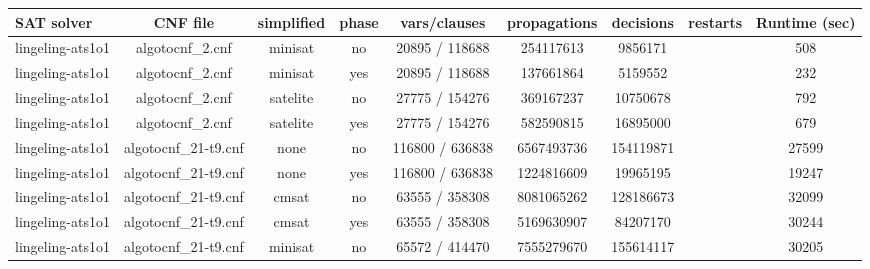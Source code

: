 \begin{appendices}
\begin{table}[p]
  \begin{center}
    \begin{tabular}{l|cccccccc}
        \textbf{SAT solver} & \textbf{CNF file} & \textbf{simplified} & \textbf{phase} & \textbf{vars/clauses} & \textbf{propagations} & \textbf{decisions} & \textbf{restarts} & \textbf{Runtime (sec)} \\
      \hline
  lingeling-ats1o1               & algotocnf\_2.cnf               & minisat    & no    & 20895 / 118688 & 254117613 & 9856171   &            & 508 \\ %
  lingeling-ats1o1               & algotocnf\_2.cnf               & minisat    & yes   & 20895 / 118688 & 137661864 & 5159552   &            & 232 \\ %
  lingeling-ats1o1               & algotocnf\_2.cnf               & satelite   & no    & 27775 / 154276 & 369167237 & 10750678  &            & 792 \\ %
  lingeling-ats1o1               & algotocnf\_2.cnf               & satelite   & yes   & 27775 / 154276 & 582590815 & 16895000  &            & 679 \\ %
  lingeling-ats1o1               & algotocnf\_21-t9.cnf           & none       & no    & 116800 / 636838 & 6567493736 & 154119871 &            & 27599 \\ %
  lingeling-ats1o1               & algotocnf\_21-t9.cnf           & none       & yes   & 116800 / 636838 & 1224816609 & 19965195  &            & 19247 \\ %
  lingeling-ats1o1               & algotocnf\_21-t9.cnf           & cmsat      & no    & 63555 / 358308 & 8081065262 & 128186673 &            & 32099 \\ %
  lingeling-ats1o1               & algotocnf\_21-t9.cnf           & cmsat      & yes   & 63555 / 358308 & 5169630907 & 84207170  &            & 30244 \\ %
  lingeling-ats1o1               & algotocnf\_21-t9.cnf           & minisat    & no    & 65572 / 414470 & 7555279670 & 155614117 &            & 30205 \\ %

\end{tabular}
\end{center}
\end{table}
\end{appendices}
